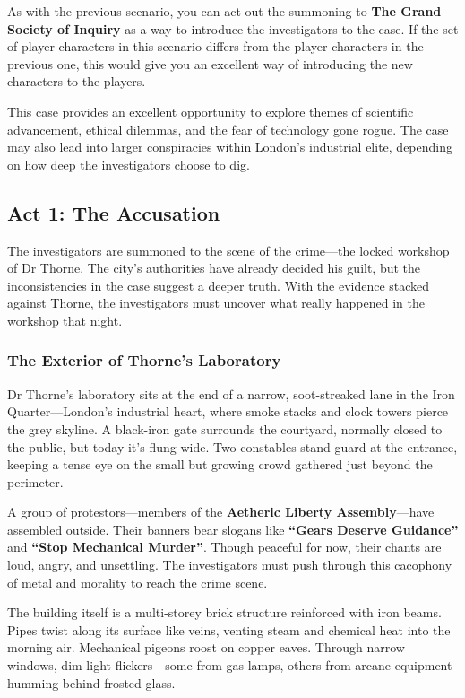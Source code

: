 As with the previous scenario, you can act out the summoning to \textbf{The Grand Society of Inquiry} as a way to introduce the investigators to the case. If the set of player characters in this scenario differs from the player characters in the previous one, this would give you an excellent way of introducing the new characters to the players.


\begin{GmTips}
    This case provides an excellent opportunity to explore themes of scientific advancement, ethical dilemmas, and the fear of technology gone rogue. The case may also lead into larger conspiracies within London's industrial elite, depending on how deep the investigators choose to dig.
\end{GmTips}



\subsection{Act 1: The Accusation}  
The investigators are summoned to the scene of the crime—the locked workshop of Dr Thorne. The city’s authorities have already decided his guilt, but the inconsistencies in the case suggest a deeper truth. With the evidence stacked against Thorne, the investigators must uncover what really happened in the workshop that night.

\subsubsection*{The Exterior of Thorne's Laboratory}
Dr Thorne’s laboratory sits at the end of a narrow, soot-streaked lane in the Iron Quarter—London’s industrial heart, where smoke stacks and clock towers pierce the grey skyline. A black-iron gate surrounds the courtyard, normally closed to the public, but today it's flung wide. Two constables stand guard at the entrance, keeping a tense eye on the small but growing crowd gathered just beyond the perimeter.

A group of protestors—members of the \textbf{Aetheric Liberty Assembly}—have assembled outside. Their banners bear slogans like \textbf{“Gears Deserve Guidance”} and \textbf{“Stop Mechanical Murder”}. Though peaceful for now, their chants are loud, angry, and unsettling. The investigators must push through this cacophony of metal and morality to reach the crime scene.

The building itself is a multi-storey brick structure reinforced with iron beams. Pipes twist along its surface like veins, venting steam and chemical heat into the morning air. Mechanical pigeons roost on copper eaves. Through narrow windows, dim light flickers—some from gas lamps, others from arcane equipment humming behind frosted glass.

